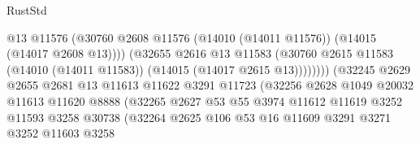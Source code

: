 \begin{lexlean}{RustStd}
\begin{coremodule}
                                            @13
                                            @11576
                                            (@30760
                                              @2608
                                              @11576
                                              (@14010 (@14011 @11576))
                                              (@14015 (@14017 @2608 @13))))
                                          (@32655
                                            @2616
                                            @13
                                            @11583
                                            (@30760
                                              @2615
                                              @11583
                                              (@14010 (@14011 @11583))
                                              (@14015 (@14017 @2615 @13))))))))
                                  (@32245
                                    @2629
                                    @2655
                                    @2681
                                    @13
                                    @11613
                                    @11622
                                    @3291
                                    @11723
                                    (@32256
                                      @2628
                                      @1049
                                      @20032
                                      @11613
                                      @11620
                                      @8888
                                      (@32265
                                        @2627
                                        @53
                                        @55
                                        @3974
                                        @11612
                                        @11619
                                        @3252
                                        @11593
                                        @3258
                                        @30738
                                        (@32264
                                          @2625
                                          @106
                                          @53
                                          @16
                                          @11609
                                          @3291
                                          @3271
                                          @3252
                                          @11603
                                          @3258

\end{coremodule}
\end{lexlean}
